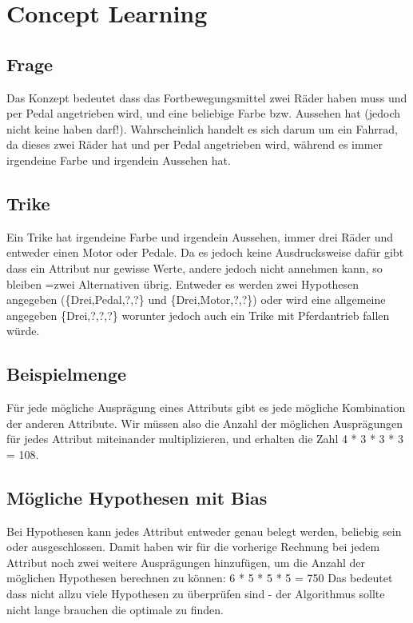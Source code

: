\documentclass[a4paper]{article}
\begin{document}
\section{Concept Learning}

\subsection{Frage}
Das Konzept bedeutet dass das Fortbewegungsmittel zwei Räder haben muss und per Pedal angetrieben wird, und eine beliebige Farbe bzw. Aussehen hat (jedoch nicht keine haben darf!). Wahrscheinlich handelt es sich darum um ein Fahrrad, da dieses zwei Räder hat und per Pedal angetrieben wird, während es immer irgendeine Farbe und irgendein Aussehen hat.

\subsection{Trike}
Ein Trike hat irgendeine Farbe und irgendein Aussehen, immer drei Räder und entweder einen Motor oder Pedale. Da es jedoch keine Ausdrucksweise dafür gibt dass ein Attribut nur gewisse Werte, andere jedoch nicht annehmen kann, so bleiben =zwei Alternativen übrig. Entweder es werden zwei Hypothesen angegeben (\{Drei,Pedal,?,?\} und \{Drei,Motor,?,?\}) oder wird eine allgemeine angegeben \{Drei,?,?,?\} worunter jedoch auch ein Trike mit Pferdantrieb fallen würde.

\subsection{Beispielmenge}
Für jede mögliche Ausprägung eines Attributs gibt es jede mögliche Kombination der anderen Attribute. Wir müssen also die Anzahl der möglichen Ausprägungen für jedes Attribut miteinander multiplizieren, und erhalten die Zahl 4 * 3 * 3 * 3 = 108.

\subsection{Mögliche Hypothesen mit Bias}
Bei Hypothesen kann jedes Attribut entweder genau belegt werden, beliebig sein oder ausgeschlossen. Damit haben wir für die vorherige Rechnung bei jedem Attribut noch zwei weitere Ausprägungen hinzufügen, um die Anzahl der möglichen Hypothesen berechnen zu können: 6 * 5 * 5 * 5 = 750
Das bedeutet dass nicht allzu viele Hypothesen zu überprüfen sind - der Algorithmus sollte nicht lange brauchen die optimale zu finden.
\end{document}

